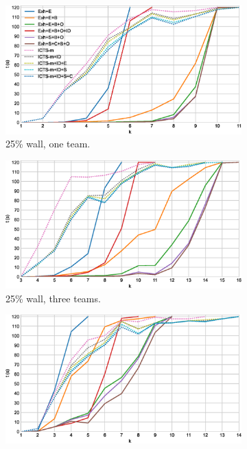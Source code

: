 \documentclass[english]{article}
\newcommand\graphwidth{0.49\textwidth}
\begin{document}
	\printbibliography
	\newpage
	\begin{figure}[t]
		\centering
		\begin{subfigure}{\graphwidth}
			\centering
			\includegraphics[width=\linewidth]{img/results/icts-comparison/25-1}
			\caption{25\% wall, one team.}
			\label{fig:i-25-1}
		\end{subfigure}
		\begin{subfigure}{\graphwidth}
			\centering
			\includegraphics[width=\linewidth]{img/results/icts-comparison/25-3}
			\caption{25\% wall, three teams.}
			\label{fig:i-25-3}
		\end{subfigure}
		\begin{subfigure}{\graphwidth}
			\centering
			\includegraphics[width=\linewidth]{img/results/icts-comparison/75-1}

\end{subfigure}
\end{figure}
\end{document}
